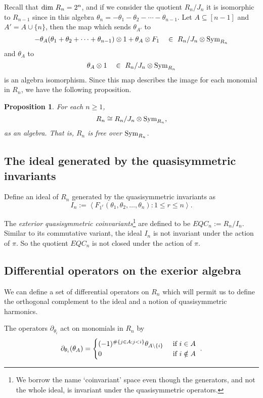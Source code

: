 \documentclass[submission]{FPSAC2023}
\newtheorem{prop}[theorem]{Proposition}
\theoremstyle{definition}
\numberwithin{equation}{section}
\begin{document}
Recall that ${\rm dim}~R_n = 2^n$,
and if we consider the quotient $R_n/J_n$ it is isomorphic to $R_{n-1}$ since
in this algebra $\theta_n = - \theta_1 -\theta_2 - \cdots - \theta_{n-1}$.
Let $A \subseteq [n-1]$ and $A' = A \cup \{n\}$, then
the map which sends
$\theta_{A'}$ to
$$-\theta_{A}(\theta_1 + \theta_2 + \cdots + \theta_{n-1}) \otimes 1
+ \theta_{A} \otimes F_1\quad \in\ R_n/J_n \otimes {\rm Sym}_{R_n}$$
and $\theta_{A}$ to
$$\theta_{A} \otimes 1 \quad \in \ R_n/J_n \otimes {\rm Sym}_{R_n}$$
is an algebra isomorphism.  Since this map describes the image
for each monomial in $R_n$, we have the following proposition.

\begin{prop} \label{prop:free}
For each $n \geq 1$,
$$R_n \cong R_n/J_n \otimes {\rm Sym}_{R_n},$$
as an algebra.  That is, $R_n$ is free over ${\rm Sym}_{R_n}$.
\end{prop}

\subsection{The ideal generated by the quasisymmetric invariants}

Define an ideal of $R_n$ generated by the quasisymmetric invariants as
\[
I_n := \left< F_{1^r}(\theta_1, \theta_2, \ldots, \theta_n) : 1 \leq r \leq n \right>.
\]


The \emph{exterior quasisymmetric coinvariants}\footnote{We borrow
the name `coinvariant' space even though the generators, and not the whole ideal, is invariant under the quasisymmetric operators.} are defined to be $EQC_n := R_n/I_n$. Similar to its commutative variant, the ideal $I_{n}$ is not invariant under the action of $\pi$. So the quotient $EQC_{n}$ is not closed under the action of $\pi$.


\subsection{Differential operators on the exerior algebra}\label{ssec:harm}
We can define a set of differential operators on $R_n$ which
will permit us to define the orthogonal complement to the
ideal and a notion of quasisymmetric harmonics.

The operators $\partial_{\theta_i}$ act on monomials in $R_n$
by
\[
\partial_{\theta_i}( \theta_A ) = \begin{cases}
(-1)^{\#\{ j \in A: j<i\}}\theta_{A \backslash \{i\}}&\hbox{ if }i \in A\\
0&\hbox{ if }i \notin A
\end{cases}~.
\]
\end{document}
